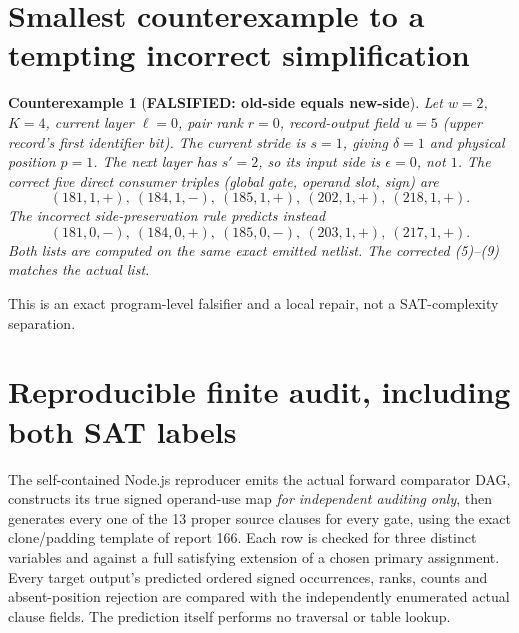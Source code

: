 \documentclass[11pt]{article}
\newtheorem{counterexample}[theorem]{Counterexample}
\begin{document}
\section{Smallest counterexample to a tempting incorrect simplification}
\begin{counterexample}[\textbf{FALSIFIED: old-side equals new-side}]
Let $w=2$, $K=4$, current layer $\ell=0$, pair rank
$r=0$, record-output field $u=5$ (upper record's
first identifier bit). The current stride is $s=1$,
giving $\delta=1$ and physical position $p=1$.
The \emph{next} layer has $s'=2$, so its input side
is $\epsilon=0$, not $1$. The correct five direct
consumer triples (global gate, operand slot, sign) are
\[
 (181,1,+),\ (184,1,-),\ (185,1,+),\
 (202,1,+),\ (218,1,+).
\]
The incorrect side-preservation rule predicts instead
\[
 (181,0,-),\ (184,0,+),\ (185,0,-),\
 (203,1,+),\ (217,1,+).
\]
Both lists are computed on the same exact emitted netlist.
The corrected (5)--(9) matches the actual list.
\end{counterexample}
This is an exact program-level falsifier and a local repair,
not a SAT-complexity separation.

\section{Reproducible finite audit, including both SAT labels}
The self-contained Node.js reproducer
emits the actual forward comparator DAG, constructs its
true signed operand-use map \emph{for independent auditing
only}, then generates every one of the 13 proper source
clauses for every gate, using the exact clone/padding
template of report 166. Each row is checked for three
distinct variables and against a full satisfying extension
of a chosen primary assignment. Every target output's
predicted ordered signed occurrences, ranks, counts and
absent-position rejection are compared with the independently
enumerated actual clause fields.  The prediction itself
performs no traversal or table lookup.
\end{document}
